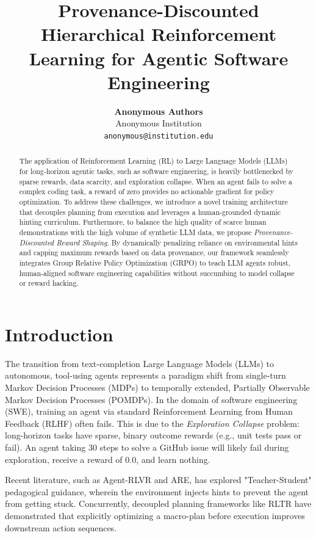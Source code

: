 \documentclass[10pt, letterpaper]{article}
\title{\vspace{-0.5in}\LARGE \bfseries Provenance-Discounted Hierarchical Reinforcement Learning for Agentic Software Engineering}
\author{
  \textbf{Anonymous Authors} \\
  Anonymous Institution \\
  \texttt{anonymous@institution.edu}
}
\date{}
\begin{document}
\maketitle

\begin{abstract}
The application of Reinforcement Learning (RL) to Large Language Models (LLMs) for long-horizon agentic tasks, such as software engineering, is heavily bottlenecked by sparse rewards, data scarcity, and exploration collapse. When an agent fails to solve a complex coding task, a reward of zero provides no actionable gradient for policy optimization. To address these challenges, we introduce a novel training architecture that decouples planning from execution and leverages a human-grounded dynamic hinting curriculum. Furthermore, to balance the high quality of scarce human demonstrations with the high volume of synthetic LLM data, we propose \textit{Provenance-Discounted Reward Shaping}. By dynamically penalizing reliance on environmental hints and capping maximum rewards based on data provenance, our framework seamlessly integrates Group Relative Policy Optimization (GRPO) to teach LLM agents robust, human-aligned software engineering capabilities without succumbing to model collapse or reward hacking.
\end{abstract}

\section{Introduction}

The transition from text-completion Large Language Models (LLMs) to autonomous, tool-using agents represents a paradigm shift from single-turn Markov Decision Processes (MDPs) to temporally extended, Partially Observable Markov Decision Processes (POMDPs). In the domain of software engineering (SWE), training an agent via standard Reinforcement Learning from Human Feedback (RLHF) often fails. This is due to the \textit{Exploration Collapse} problem: long-horizon tasks have sparse, binary outcome rewards (e.g., unit tests pass or fail). An agent taking 30 steps to solve a GitHub issue will likely fail during exploration, receive a reward of $0.0$, and learn nothing.

Recent literature, such as Agent-RLVR and ARE, has explored "Teacher-Student" pedagogical guidance, wherein the environment injects hints to prevent the agent from getting stuck. Concurrently, decoupled planning frameworks like RLTR have demonstrated that explicitly optimizing a macro-plan before execution improves downstream action sequences.
\end{document}
